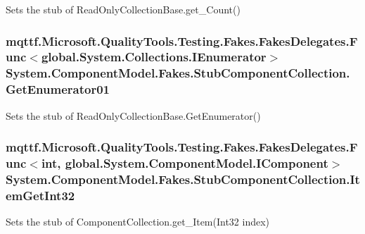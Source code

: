 Sets the stub of Read\-Only\-Collection\-Base.\-get\-\_\-\-Count()

\hypertarget{class_system_1_1_component_model_1_1_fakes_1_1_stub_component_collection_aa64378be301e53cefeb3ccfd28d0d9d4}{
\subsubsection[{Get\-Enumerator01}]{\setlength{\rightskip}{0pt plus 5cm}mqttf.\-Microsoft.\-Quality\-Tools.\-Testing.\-Fakes.\-Fakes\-Delegates.\-Func$<$global.\-System.\-Collections.\-I\-Enumerator$>$ System.\-Component\-Model.\-Fakes.\-Stub\-Component\-Collection.\-Get\-Enumerator01}}\label{class_system_1_1_component_model_1_1_fakes_1_1_stub_component_collection_aa64378be301e53cefeb3ccfd28d0d9d4}


Sets the stub of Read\-Only\-Collection\-Base.\-Get\-Enumerator()

\hypertarget{class_system_1_1_component_model_1_1_fakes_1_1_stub_component_collection_a709941f3c931bb07818fb1594a381715}{
\subsubsection[{Item\-Get\-Int32}]{\setlength{\rightskip}{0pt plus 5cm}mqttf.\-Microsoft.\-Quality\-Tools.\-Testing.\-Fakes.\-Fakes\-Delegates.\-Func$<$int, global.\-System.\-Component\-Model.\-I\-Component$>$ System.\-Component\-Model.\-Fakes.\-Stub\-Component\-Collection.\-Item\-Get\-Int32}}\label{class_system_1_1_component_model_1_1_fakes_1_1_stub_component_collection_a709941f3c931bb07818fb1594a381715}


Sets the stub of Component\-Collection.\-get\-\_\-\-Item(\-Int32 index)

